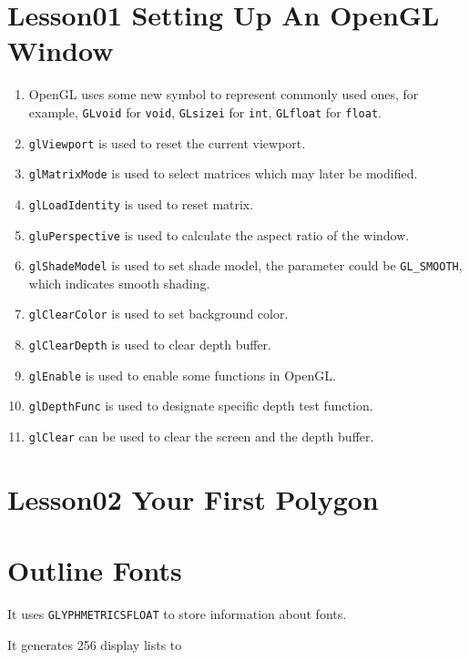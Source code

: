 \section{Lesson01 Setting Up An OpenGL Window}

\begin{enumerate}
	\item OpenGL uses some new symbol to represent commonly used ones, for example, \verb|GLvoid| for \verb|void|, \verb|GLsizei| for \verb|int|, \verb|GLfloat| for \verb|float|.
	\item \verb|glViewport| is used to reset the current viewport.
	\item \verb|glMatrixMode| is used to select matrices which may later be modified.
	\item \verb|glLoadIdentity| is used to reset matrix.
	\item \verb|gluPerspective| is used to calculate the aspect ratio of the window.
	\item \verb|glShadeModel| is used to set shade model, the parameter could be \verb|GL_SMOOTH|, which indicates smooth shading.
	\item \verb|glClearColor| is used to set background color.
	\item \verb|glClearDepth| is used to clear depth buffer.
	\item \verb|glEnable| is used to enable some functions in OpenGL.
	\item \verb|glDepthFunc| is used to designate specific depth test function.
	\item \verb|glClear| can be used to clear the screen and the depth buffer.
\end{enumerate}

\section{Lesson02 Your First Polygon}


\section{Outline Fonts}

It uses \verb|GLYPHMETRICSFLOAT| to store information about fonts.

It generates 256 display lists to 


